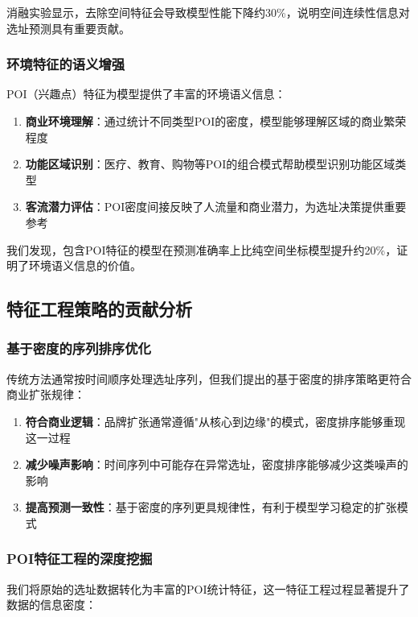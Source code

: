 \documentclass{article}
\begin{document}
消融实验显示，去除空间特征会导致模型性能下降约30\%，说明空间连续性信息对选址预测具有重要贡献。

\subsubsection{环境特征的语义增强}

POI（兴趣点）特征为模型提供了丰富的环境语义信息：

\begin{enumerate}
\item \textbf{商业环境理解}：通过统计不同类型POI的密度，模型能够理解区域的商业繁荣程度
\item \textbf{功能区域识别}：医疗、教育、购物等POI的组合模式帮助模型识别功能区域类型
\item \textbf{客流潜力评估}：POI密度间接反映了人流量和商业潜力，为选址决策提供重要参考
\end{enumerate}

我们发现，包含POI特征的模型在预测准确率上比纯空间坐标模型提升约20\%，证明了环境语义信息的价值。

\subsection{特征工程策略的贡献分析}

\subsubsection{基于密度的序列排序优化}

传统方法通常按时间顺序处理选址序列，但我们提出的基于密度的排序策略更符合商业扩张规律：

\begin{enumerate}
\item \textbf{符合商业逻辑}：品牌扩张通常遵循"从核心到边缘"的模式，密度排序能够重现这一过程
\item \textbf{减少噪声影响}：时间序列中可能存在异常选址，密度排序能够减少这类噪声的影响
\item \textbf{提高预测一致性}：基于密度的序列更具规律性，有利于模型学习稳定的扩张模式
\end{enumerate}

\subsubsection{POI特征工程的深度挖掘}

我们将原始的选址数据转化为丰富的POI统计特征，这一特征工程过程显著提升了数据的信息密度：
\end{document}
